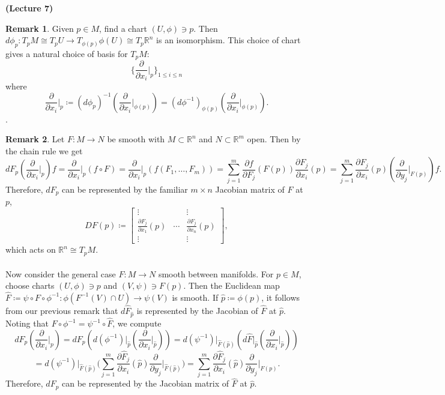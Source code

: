 \documentclass[10pt,letterpaper,cm]{nupset}
\theoremstyle{definition}
\newtheorem{remark}{Remark}
\newcommand{\R}{\mathbb R}
\newcommand{\1}{\mathbf{1}}
\newcommand{\0}{\vec 0}
\begin{document}
\begin{center}
{\textbf{(Lecture 7)}} 
\end{center}

\begin{remark}
Given $p\in M$, find a chart $(U, \phi)\ni p$. Then $d\phi_p : T_pM \cong T_pU\to T_{\phi(p)}\phi(U) \cong T_p \R^n$ is an isomorphism. This choice of chart gives a natural choice of basis for $T_pM$: $$\{\frac{\partial}{\partial{x_i}}\rvert_{p} \}_{1\leq i \leq n}$$ where $$\frac{\partial}{\partial{x_i}}\rvert_{p}\coloneqq  (d\phi_p)^{-1}(\frac{\partial}{\partial{x_i}}\rvert_{\phi(p)}) = (d\phi^{-1})_{\phi(p)}(\frac{\partial}{\partial{x_i}}\rvert_{\phi(p)}).$$.
\end{remark}

\begin{remark}
Let $F: M \to N$ be smooth with $M\subset \R^n$ and $N \subset \R^m$ open. Then by the chain rule we get 
$$dF_p(\frac{\partial}{\partial{x_i}}\rvert_{p})f = \frac{\partial}{\partial{x_i}}\rvert_{p}(f \circ F) = \frac{\partial}{\partial{x_i}}\rvert_{p}(f(F_1, \ldots, F_m)) =\sum_{j=1}^m  \frac{\partial{f}}{\partial{F_j}}(F(p))\frac{\partial{F_j}}{\partial{x_i}}(p)= \sum_{j=1}^m \frac{\partial{F_j}}{\partial{x_i}}(p) (\frac{\partial}{\partial{y_j}}\rvert_{F(p)})f.$$ Therefore, $dF_p$ can be represented by the familiar $m\times n$ Jacobian matrix of $F$ at $p$, 
 $$DF(p) \coloneqq  \begin{bmatrix}  \vdots & & \vdots \\ \frac{\partial{F_j}}{\partial{x_1}}(p)  & \cdots & \frac{\partial{F_j}}{\partial{x_n}}(p)  \\ \vdots & & \vdots  
\end{bmatrix},$$ which acts on $\R^n \cong T_pM$.
\\ \\
Now consider the general case $F: M \to N$ smooth between manifolds. For $p \in M$, choose charts $(U, \phi) \ni p$ and $(V, \psi) \ni F(p)$. Then the Euclidean map $\hat{F}\coloneqq  \psi \circ F \circ \phi^{-1} : \phi(F^{-1}(V) \cap U) \to \psi(V)$ is smooth. If $\hat{p}\coloneqq  \phi(p)$, it follows from our previous remark that $d\hat{F}_{\hat{p}}$ is represented by the Jacobian of $\hat{F}$ at $\hat{p}$. Noting that $F \circ \phi^{-1} = \psi^{-1} \circ \hat{F}$, we compute
$$dF_p(\frac{\partial}{\partial{x_i}}\rvert_p) =  dF_p(d(\phi^{-1})\rvert_{\hat{p}}(\frac{\partial}{\partial{x_i}}\rvert_{\hat{p}})) = d(\psi^{-1})\rvert_{\hat{F}(\hat{p})}(d\hat{F}\rvert_{\hat{p}}(\frac{\partial}{\partial{x_i}}\rvert_{\hat{p}}))$$
$$= d(\psi^{-1})\rvert_{\hat{F}(\hat{p})}\big(\sum_{j=1}^m \frac{\partial{\hat{F}_j}}{\partial{x_i}}(\hat{p})\frac{\partial}{\partial{y_j}}\rvert_{\hat{F}(\hat{p})}\big) = 
\sum_{j=1}^m \frac{\partial{\hat{F}_j}}{\partial{x_i}}(\hat{p})\frac{\partial}{\partial{y_j}}\rvert_{F(p)}.
$$
Therefore, $dF_p$ can be represented by the Jacobian matrix of $\hat{F}$ at $\hat{p}$. 
\end{remark}
\end{document}

